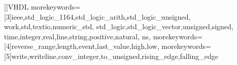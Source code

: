 []{VHDL}%
{%
morekeywords=[3]{ieee,std_logic_1164,std_logic_arith,std_logic_unsigned,%
	work,std,textio,numeric_std,%
	std_logic,std_logic_vector,unsigned,signed,%
	time,integer,real,line,string,positive,natural,%
	ns},%
morekeywords=[4]{reverse_range,length,event,last_value,high,low},%
morekeywords=[5]{write,writeline,conv_integer,to_unsigned,rising_edge,falling_edge}%
}
